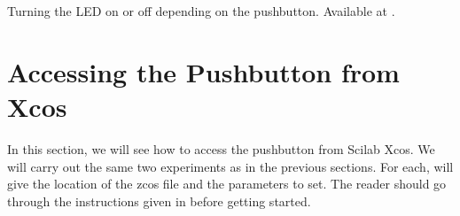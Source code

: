 \begin{scicode}
  {Turning the LED on or off depending on the pushbutton.  Available at
  .}
\label{sci:push-200}

\end{scicode}




\section{Accessing the Pushbutton from Xcos}
\label{sec:push-xcos}
In this section, we will see how to access the pushbutton from Scilab
Xcos.  We will carry out the same two experiments as in the previous
sections.  For each, will give the location of the zcos file and the
parameters to set.  The reader should go through the instructions
given in  before getting started.

